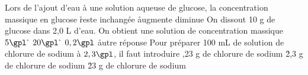\q
Lors de l'ajout d'eau à une solution aqueuse de glucose, la concentration massique en glucose
\r
reste inchangée
\r
augmente
\rv
diminue
\q
On dissout 10 g de glucose dans 2,0 L d'eau. On obtient une solution de concentration massique
\rv
$ 5 \gpl $
\r
$ 20 \gpl $
\r
$ 0,2 \gpl $
\r 
autre réponse
\q
Pour préparer 100 mL de solution de chlorure de sodium à  $ 2,3 \gpl$, il faut introduire
,23 g de chlorure de sodium
\r
2,3 g de chlorure de sodium
\r
23 g de chlorure de sodium
